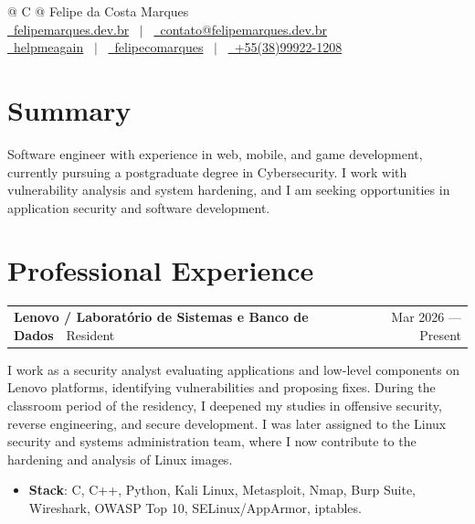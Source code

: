 \documentclass[a4paper,12pt]{article}
\makeatletter
\newenvironment{jobshort}[3]
    {
    \begin{tabularx}{\linewidth}{@{}l X r@{}}
    \textbf{#1}\ \ {\footnotesize\if\relax\detokenize{#3}\relax\else #3\fi} & \hfill & #2 \\
    \end{tabularx}
    }
    {
    }
\makeatother
\begin{document}
\pagestyle{empty} 


\begin{tabularx}{\linewidth}{@{} C @{}}
\Huge{Felipe da Costa Marques} \\[7.5pt]

\href{https://felipemarques.dev.br/}{\raisebox{-0.05\height}\faGlobe\ felipemarques.dev.br}
\ $|$ \
\href{mailto:contato@felipemarques.dev.br}{\raisebox{-0.05\height}\faEnvelope\ contato@felipemarques.dev.br} \\

\href{https://github.com/helpmeagain}{\raisebox{-0.05\height}\faGithub\ helpmeagain}
\ $|$ \
\href{https://www.linkedin.com/in/felipecomarques/}{\raisebox{-0.05\height}\faLinkedin\ felipecomarques}
\ $|$ \
\href{tel:+5538999221208}{\raisebox{-0.05\height}\faMobile \ +55(38)99922-1208} \\

\end{tabularx}


\section{Summary}
Software engineer with experience in web, mobile, and game development, currently pursuing a postgraduate degree in Cybersecurity. I work with vulnerability analysis and system hardening, and I am seeking opportunities in application security and software development.

\section{Professional Experience}

\begin{jobshort}{Lenovo / Laboratório de Sistemas e Banco de Dados}{Mar 2026 — Present}{Resident}
I work as a security analyst evaluating applications and low-level components on Lenovo platforms, identifying vulnerabilities and proposing fixes. During the classroom period of the residency, I deepened my studies in offensive security, reverse engineering, and secure development. I was later assigned to the Linux security and systems administration team, where I now contribute to the hardening and analysis of Linux images.
\begin{itemize}[nosep,after=\strut, leftmargin=0em, itemsep=3pt,label={}]
    \item \textbf{Stack}: C, C++, Python, Kali Linux, Metasploit, Nmap, Burp Suite, Wireshark, OWASP Top 10, SELinux/AppArmor, iptables.
\end{itemize}
\end{jobshort}
\end{document}

